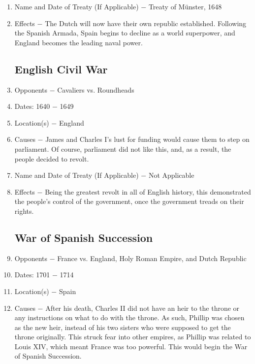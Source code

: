 \documentclass[12pt]{article}
\begin{document}
\begin{enumerate}
\item Name and Date of Treaty (If Applicable) $-$ Treaty of M\"unster, 1648

\item Effects $-$ The Dutch will now have their own republic established. Following the Spanish Armada, Spain begins to decline as a world superpower, and England becomes the leading naval power.

\subsection{English Civil War}

\item Opponents $-$ Cavaliers vs. Roundheads

\item Dates: 1640 $-$ 1649

\item Location(s) $-$ England

\item Causes $-$ James and Charles I's lust for funding would cause them to step on parliament. Of course, parliament did not like this, and, as a result, the people decided to revolt.

\item Name and Date of Treaty (If Applicable) $-$ Not Applicable

\item Effects $-$ Being the greatest revolt in all of English history, this demonstrated the people's control of the government, once the government treads on their rights.

\subsection{War of Spanish Succession}
 
\item Opponents $-$ France vs. England, Holy Roman Empire, and Dutch Republic

\item Dates: 1701 $-$ 1714

\item Location(s) $-$ Spain

\item Causes $-$ After his death, Charles II did not have an heir to the throne or any instructions on what to do with the throne. As such, Phillip was chosen as the new heir, instead of his two sisters who were supposed to get the throne originally. This struck fear into other empires, as Phillip was related to Louis XIV, which meant France was too powerful. This would begin the War of Spanish Succession.


\end{enumerate}
\end{document}
